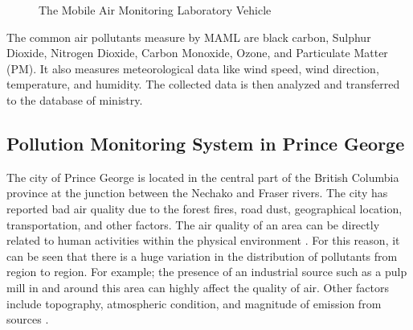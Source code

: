 \begin{enumerate}
\begin{figure}[h]
    \caption{ The Mobile Air Monitoring Laboratory Vehicle  \cite{MAML}}
    
    \label{MAML}
\end{figure}

The common air pollutants measure by MAML are black carbon, Sulphur Dioxide, Nitrogen Dioxide, Carbon Monoxide, Ozone, and Particulate Matter (PM). 
It also measures meteorological data like wind speed, wind direction, temperature, and humidity.
The collected data is then analyzed and transferred to the database of ministry.

\end{enumerate}



 \subsection{Pollution Monitoring System in Prince George}
 

 The city of Prince George is located in the central part of the British Columbia province at the junction between the Nechako and Fraser rivers. The city has reported bad air quality due to the forest fires, road dust, geographical location, transportation, and other factors.
The air quality of an area can be directly related to human activities within the physical environment \cite{manisalidis2020environmental}.
 For this reason, it can be seen that there is a huge variation in the distribution of pollutants from region to region. For example; the presence of an industrial source such as a pulp mill in and around this area can highly affect the quality of air. Other factors include topography, atmospheric condition, and magnitude of emission from sources \cite{Prevention2000}. 
 
